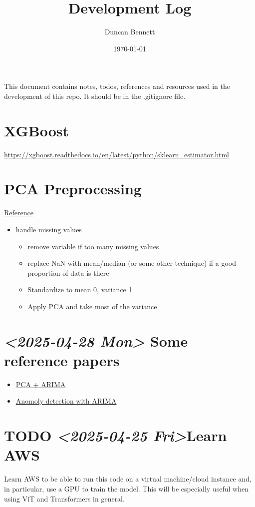 \documentclass[11pt]{article}
\author{Duncan Bennett}
\date{\today}
\title{Development Log}
\begin{document}
\maketitle
\tableofcontents

This document contains notes, todos, references and resources used in the
development of this repo. It should be in the .gitignore file.

\section*{XGBoost}
\label{sec:orgbea5820}
\url{https://xgboost.readthedocs.io/en/latest/python/sklearn\_estimator.html}
\section*{PCA Preprocessing}
\label{sec:org44b1785}
\href{https://safjan.com/before-pca/}{Reference}
\begin{itemize}
\item handle missing values
\begin{itemize}
\item remove variable if too many missing values
\item replace NaN with mean/median (or some other technique) if a good
proportion of data is there
\item Standardize to mean 0, variance 1
\item Apply PCA and take most of the variance
\end{itemize}
\end{itemize}
\section*{\textit{<2025-04-28 Mon> } Some reference papers}
\label{sec:orgffa50cd}
\begin{itemize}
\item \href{https://www.matec-conferences.org/articles/matecconf/pdf/2020/05/matecconf\_cscns2020\_05009.pdf}{PCA + ARIMA}
\item \href{https://nixustechnologies.com/anomaly-detection-with-arima-model-using-python/}{Anomoly detection with ARIMA}
\end{itemize}
\section*{{\bfseries\sffamily TODO} \textit{<2025-04-25 Fri>}Learn AWS}
\label{sec:orgdd5ada6}
Learn AWS to be able to run this code on a virtual machine/cloud instance
and, in particular, use a GPU to train the model. This will be especially
useful when using ViT and Transformers in general.
\end{document}
